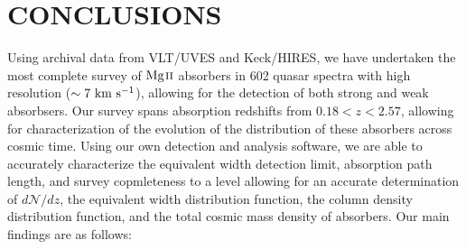 \section{\MakeUppercase{Conclusions}}
\label{ch8}


Using archival data from VLT/UVES and Keck/HIRES, we have undertaken the most complete survey of ${\hbox{{\rm Mg}\kern 0.1em{\sc ii}}}$ absorbers in 602 quasar spectra with high resolution ($\sim 7~\mathrm{\hbox{km~s$^{-1}$}}$), allowing for the detection of both strong and weak {\MgII} absorbsers. Our survey spans absorption redshifts from $0.18 < z < 2.57$, allowing for characterization of the evolution of the distribution of these absorbers across cosmic time. Using our own detection and analysis software, we are able to accurately characterize the equivalent width detection limit, absorption path length, and survey copmleteness to a level allowing for an accurate determination of $d\mathcal{N}\!/dz$, the equivalent width distribution function, the column density distribution function, and the total cosmic mass density of {\MgII} absorbers. Our main findings are as follows:

